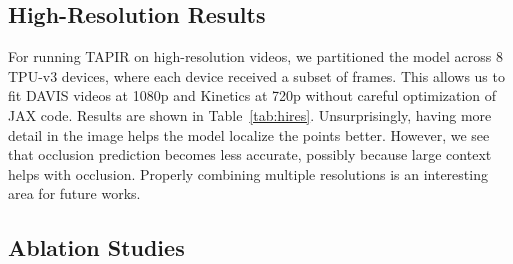 \documentclass[10pt,twocolumn,letterpaper]{article}
\newcommand{\datasetname}{TAP-Vid}
\begin{document}
\subsection{High-Resolution Results}

\begin{table}[t]
\begin{center}
\caption{{\bf TAPIR at high resolution on \datasetname}.  Each video is resized so it is at most $1080$ pixels tall and $1920$ pixels wide for DAVIS, and $720$ pixels tall and $1280$ pixels wide for Kinetics.}
\label{tab:hires}
\vspace{-0.3cm}
\end{center}
\end{table}

For running TAPIR on high-resolution videos, we partitioned the model across 8 TPU-v3 devices, where each device received a subset of frames.  This allows us to fit DAVIS videos at 1080p and Kinetics at 720p without careful optimization of JAX code.  Results are shown in Table~\ref{tab:hires}.
Unsurprisingly, having more detail in the image helps the model localize the points better.  However, we see that occlusion prediction becomes less accurate, possibly because large context helps with occlusion.  Properly combining multiple resolutions is an interesting area for future works.


\subsection{Ablation Studies}
\end{document}

